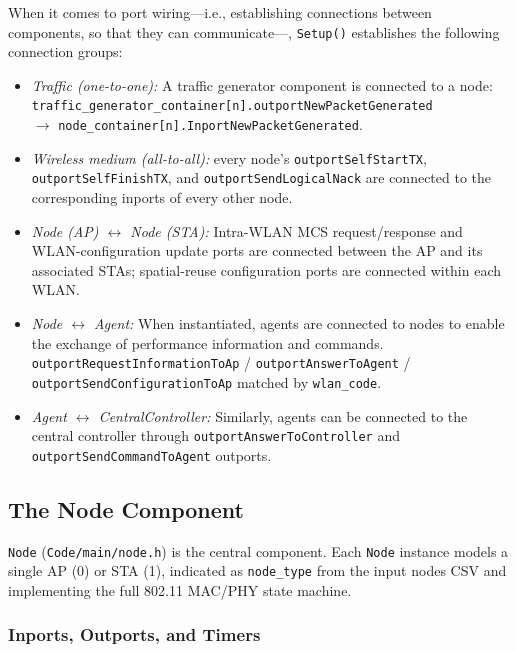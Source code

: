 \documentclass[11pt,a4paper]{article}
\begin{document}
When it comes to port wiring---i.e., establishing connections between components, so that they can communicate---,  \texttt{Setup()} establishes the following connection groups:
\begin{itemize}
    \item \textit{Traffic (one-to-one):} A traffic generator component is connected to a node:\\    \texttt{traffic\_generator\_container[n].outportNewPacketGenerated} \\$\to$ \texttt{node\_container[n].InportNewPacketGenerated}.
    \item \textit{Wireless medium (all-to-all):} every node's \texttt{outportSelfStartTX}, \texttt{outportSelfFinishTX}, and \texttt{outportSendLogicalNack} are connected to the corresponding inports of every other node.
    \item \textit{Node (AP) $\leftrightarrow$ Node (STA):} Intra-WLAN MCS request/response and WLAN-configuration update ports are connected between the AP and its associated STAs; spatial-reuse configuration ports are connected within each WLAN.
    \item \textit{Node $\leftrightarrow$ Agent:} When instantiated, agents are connected to nodes to enable the exchange of performance information and commands. \texttt{outportRequestInformationToAp} / \texttt{outportAnswerToAgent} / \texttt{outportSendConfigurationToAp} matched by \texttt{wlan\_code}.
    \item \textit{Agent $\leftrightarrow$ CentralController:} Similarly, agents can be connected to the central controller through \texttt{outportAnswerToController} and \texttt{outportSendCommandToAgent} outports.
\end{itemize}


\subsection{The Node Component}
\label{sec:node}

\texttt{Node} (\texttt{Code/main/node.h}) is the central component.  Each \texttt{Node} instance models a single AP (0) or STA (1), indicated as \texttt{node\_type} from the input nodes CSV and implementing the full 802.11 MAC/PHY state machine.

\subsubsection{Inports, Outports, and Timers}
\end{document}
